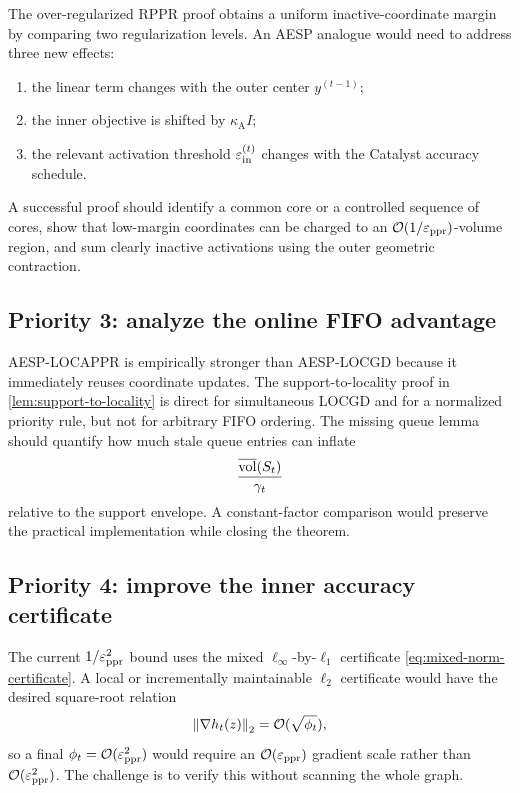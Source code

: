 The over-regularized RPPR proof obtains a uniform inactive-coordinate margin
by comparing two regularization levels.  An AESP analogue would need to
address three new effects:
\begin{enumerate}[leftmargin=2em]
\item the linear term changes with the outer center \(y^{(t-1)}\);
\item the inner objective is shifted by \(\kappa_{\mathrm A} I\);
\item the relevant activation threshold \(\varepsilon_{\mathrm{in}}^{(t)}\) changes with the Catalyst
      accuracy schedule.
\end{enumerate}
A successful proof should identify a common core or a controlled sequence of
cores, show that low-margin coordinates can be charged to an
\(\mathcal O(1/\varepsilon_{\mathrm{ppr}})\)-volume region, and sum clearly inactive activations
using the outer geometric contraction.

\subsection{Priority 3: analyze the online FIFO advantage}

AESP-LOCAPPR is empirically stronger than AESP-LOCGD because it immediately
reuses coordinate updates.  The support-to-locality proof in
\cref{lem:support-to-locality} is direct for simultaneous LOCGD and for a
normalized priority rule, but not for arbitrary FIFO ordering.  The missing
queue lemma should quantify how much stale queue entries can inflate
\begin{equation}
    \frac{\overline{\operatorname{vol}}(S_t)}{\gamma_t}
    \label{eq:fifo-locality-object}
\end{equation}
relative to the support envelope.  A constant-factor comparison would preserve
the practical implementation while closing the theorem.

\subsection{Priority 4: improve the inner accuracy certificate}

The current \(1/\varepsilon_{\mathrm{ppr}}^2\) bound uses the mixed
\(\ell_\infty\)-by-\(\ell_1\) certificate
\cref{eq:mixed-norm-certificate}.  A local or incrementally maintainable
\(\ell_2\) certificate would have the desired square-root relation
\begin{equation}
    \left\lVert \nabla h_t(z)\right\rVert_2
    =\mathcal O(\sqrt{\phi_t}),
    \label{eq:l2-certificate-target}
\end{equation}
so a final \(\phi_t=\mathcal O(\varepsilon_{\mathrm{ppr}}^2)\) would require an
\(\mathcal O(\varepsilon_{\mathrm{ppr}})\) gradient scale rather than
\(\mathcal O(\varepsilon_{\mathrm{ppr}}^2)\).  The challenge is to verify this without scanning the
whole graph.

